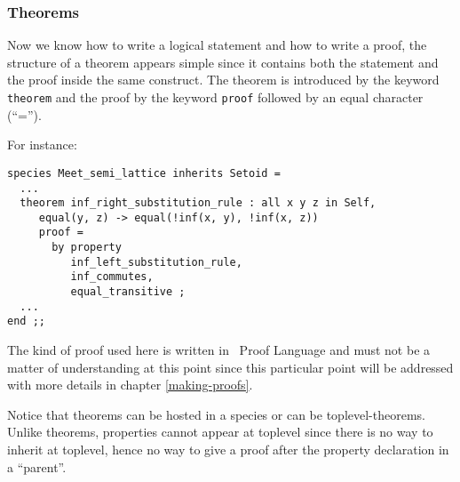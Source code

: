 \subsubsection{Theorems}
Now we know how to write a logical statement and
how
to write a proof, the structure of a theorem appears simple since it
contains both the statement and the proof inside the same
construct. The theorem is introduced by the keyword {\tt theorem} and
the proof by the keyword {\tt proof} followed by an equal character
(``='').
\begin{syn}
 \is
    \tok{:} 
   
\end{syn}


\noindent For instance:
{\scriptsize
\begin{lstlisting}
species Meet_semi_lattice inherits Setoid =
  ...
  theorem inf_right_substitution_rule : all x y z in Self,
     equal(y, z) -> equal(!inf(x, y), !inf(x, z))
     proof =
       by property
          inf_left_substitution_rule,
          inf_commutes,
          equal_transitive ;
  ...
end ;;
\end{lstlisting}
}
The kind of proof used here is written in \focal\ Proof Language and
must not be a matter of understanding at this point since this
particular point will be addressed with more details in chapter
\ref{making-proofs}.

Notice that theorems can be hosted in a species or can be
toplevel-theorems.
Unlike theorems, properties cannot appear at
toplevel since there is no way to inherit at toplevel, hence no
way to give a proof after the property declaration in a ``parent''.
